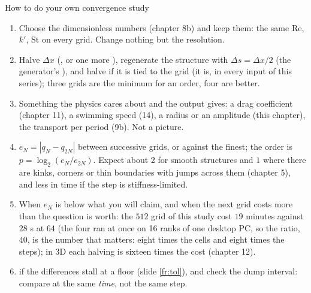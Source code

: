 \documentclass[aspectratio=169,11pt]{beamer}
\begin{document}
\begin{frame}{How to do your own convergence study}
\label{fr:howto}
\footnotesize
\begin{enumerate}
  \item {} Choose the dimensionless numbers (chapter 8b) and keep them: the same $\mathrm{Re}$, $k'$, $\mathrm{St}$ on every grid. Change nothing but the resolution.
  \item {} Halve $\Delta x$ (, or one more ), regenerate the structure with $\Delta s = \Delta x/2$ (the generator's ), and halve  if it is tied to the grid (it is, in every input of this series); three grids are the minimum for an order, four are better.
  \item {} Something the physics cares about and the output gives: a drag coefficient (chapter 11), a swimming speed (14), a radius or an amplitude (this chapter), the transport per period (9b). Not a picture.
  \item {} $e_N = |q_N - q_{2N}|$ between successive grids, or against the finest; the order is $p = \log_2(e_N/e_{2N})$. Expect about $2$ for smooth structures and $1$ where there are kinks, corners or thin boundaries with jumps across them (chapter 5), and less in time if the step is stiffness-limited.
  \item {} When $e_N$ is below what you will claim, and when the next grid costs more than the question is worth: the $512$ grid of this study cost $19$ minutes against $28$ s at $64$ (the four ran at once on 16 ranks of one desktop PC, so the ratio, $40$, is the number that matters: eight times the cells and eight times the steps); in 3D each halving is sixteen times the cost (chapter 12).
  \item {} if the differences stall at a floor (slide \ref{fr:tol}), and check the dump interval: compare at the same \emph{time}, not the same step.
\end{enumerate}
\end{frame}
\end{document}
